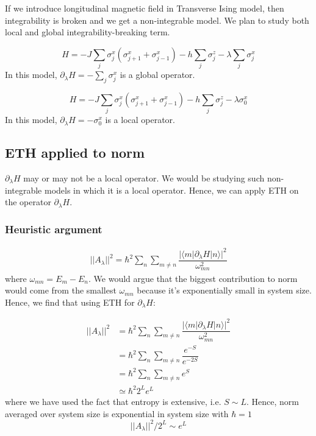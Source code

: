 \documentclass[11pt,a4paper]{article}
\begin{document}
If we introduce longitudinal magnetic field in Transverse Ising model, then integrability is broken and we get a non-integrable model. We plan to study both local  and global integrability-breaking term. 

\begin{equation}
H= -J \sum_{j} \sigma_j^x (\sigma_{j+1}^x+ \sigma_{j-1}^x) - h\sum_{j} \sigma_j^z -\lambda \sum_{j} \sigma_j^x 
\end{equation}
In this model, $\partial_{\lambda}H = - \sum_{j} \sigma_j^x  $ is a global operator.


\begin{equation}
H= -J \sum_{j} \sigma_j^x (\sigma_{j+1}^x+ \sigma_{j-1}^x) - h\sum_{j} \sigma_j^z -\lambda  \sigma_0^x 
\end{equation}
In this model, $\partial_{\lambda}H = -  \sigma_0^x  $ is a local operator.


\subsection{ETH applied to norm}
$\partial_{\lambda}H$ may or may not be a local operator. We would be studying such non-integrable models in which it is a local operator. Hence, we can apply ETH on the operator $\partial_{\lambda}H$.

\subsubsection{Heuristic argument}
\begin{align*}
||A_{\lambda}||^2= \hbar^2\sum_n \sum_{m \neq n}  \dfrac{|\langle m | \partial_{\lambda}H| n \rangle|^2}{\omega_{mn}^2}
\end{align*}
where $\omega_{mn}= E_m-E_n$.
We would argue that the biggest contribution to norm would come from the smallest $\omega_{mn}$ because it's exponentially small in system size. Hence, we find that using ETH for  $\partial_{\lambda}H$:

\begin{align*}
||A_{\lambda}||^2&= \hbar^2\sum_n \sum_{m \neq n}  \dfrac{|\langle m | \partial_{\lambda}H| n \rangle|^2}{\omega_{mn}^2}\\
&= \hbar^2\sum_n \sum_{m \neq n}  \dfrac{ e^{-S}}{e^{-2S}} \\
&= \hbar^2\sum_n \sum_{m \neq n}  e^{S} \\
& \simeq \hbar^2 2^L  e^{L} 
\end{align*}
where we have used the fact that entropy is extensive, i.e. $S \sim L$. Hence, norm averaged over system size is exponential in system size with $\hbar=1$
\begin{equation}
\boxed{||A_{\lambda}||^2/ 2^L \sim  e^{L} 
}
\end{equation}
\end{document}
